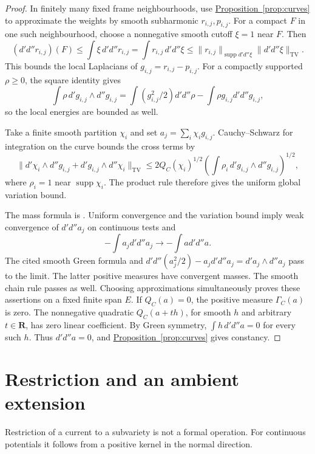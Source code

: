 \documentclass[11pt]{amsart}
\theoremstyle{definition}
\theoremstyle{remark}
\numberwithin{equation}{section}
\newcommand{\ddc}{d'd''}
\newcommand{\R}{\mathbf R}
\newcommand{\namedref}[2]{%
 \begingroup
 \ifstrequal{#1}{Section}{\hypersetup{linkcolor=sectionteal}}{%
  \ifstrequal{#1}{Appendix}{\hypersetup{linkcolor=sectionteal}}{}}%
 \hyperref[#2]{#1~\ref*{#2}}%
 \endgroup}
\newcommand{\TV}{\mathrm{TV}}
\DeclareMathOperator{\supp}{supp}
\begin{document}
\begin{proof}
In finitely many fixed frame neighbourhoods, use
\namedref{Proposition}{prop:curves} to approximate the weights by smooth
subharmonic \(r_{i,j},p_{i,j}\). For a compact \(F\) in one such
neighbourhood, choose a nonnegative smooth cutoff \(\xi=1\) near \(F\).
Then
\[
 (\ddc r_{i,j})(F)
 \leq\int\xi\,\ddc r_{i,j}
 =\int r_{i,j}\,\ddc\xi
 \leq\|r_{i,j}\|_{\supp\ddc\xi}\|\ddc\xi\|_{\TV}.
\]
This bounds the local Laplacians of
\(g_{i,j}=r_{i,j}-p_{i,j}\). For a compactly supported
\(\rho\geq0\), the square identity gives
\[
 \int\rho\,d'g_{i,j}\wedge d''g_{i,j}
 =\int(g_{i,j}^2/2)\ddc\rho
   -\int\rho g_{i,j}\ddc g_{i,j},
\]
so the local energies are bounded as well.

Take a finite smooth partition \(\chi_i\) and set
\(a_j=\sum_i\chi_i g_{i,j}\). Cauchy--Schwarz for integration on
the curve bounds the cross terms by
\[
 \|d'\chi_i\wedge d''g_{i,j}
       +d'g_{i,j}\wedge d''\chi_i\|_{\TV}
 \leq2Q_C(\chi_i)^{1/2}
 \left(\int\rho_i\,d'g_{i,j}\wedge d''g_{i,j}\right)^{1/2},
\]
where \(\rho_i=1\) near \(\supp\chi_i\).
The product rule therefore gives the uniform global variation bound.

The mass formula is \cite[Corollary 18.1.7]{CLD25}.
Uniform convergence and the variation bound imply weak convergence
of \(\ddc a_j\) on continuous tests and
\[
 -\int a_j\ddc a_j\longrightarrow-\int a\ddc a.
\]
The cited smooth Green formula and
\(\ddc(a_j^2/2)-a_j\ddc a_j=d'a_j\wedge d''a_j\) pass to the limit.
The latter positive measures have convergent masses. The smooth
chain rule passes as well. Choosing approximations simultaneously
proves these assertions on a fixed finite span \(E\).
If \(Q_C(a)=0\), the positive measure \(\Gamma_C(a)\) is zero.
The nonnegative quadratic \(Q_C(a+th)\), for smooth \(h\) and
arbitrary \(t\in\R\), has zero linear coefficient. By Green symmetry,
\(\int h\,\ddc a=0\) for every such \(h\). Thus \(\ddc a=0\), and
\namedref{Proposition}{prop:curves} gives constancy.
\end{proof}

\section{Restriction and an ambient extension}\label{sec:restriction}

Restriction of a current to a subvariety is not a formal operation.
For continuous potentials it follows from a positive kernel in the
normal direction.
\end{document}

